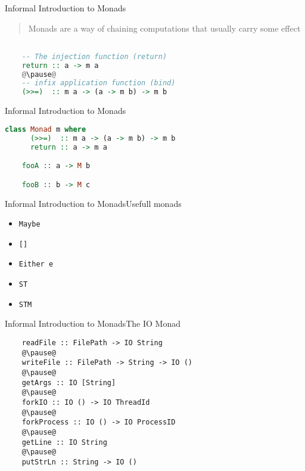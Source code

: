 \documentclass[rail]{beamer}
\begin{document}
\begin{frame}[fragile]{Informal Introduction to Monads}

  \begin{quote}
    Monads are a way of chaining computations that usually carry some
    effect
  \end{quote}
  \pause
  \begin{lstlisting}[language=Haskell]

    -- The injection function (return)
    return :: a -> m a
    @\pause@
    -- infix application function (bind)
    (>>=)  :: m a -> (a -> m b) -> m b

  \end{lstlisting}


\end{frame}

\begin{frame}[fragile]{Informal Introduction to Monads}
  \begin{lstlisting}[language=Haskell]
    class Monad m where
      (>>=)  :: m a -> (a -> m b) -> m b
      return :: a -> m a

    fooA :: a -> M b

    fooB :: b -> M c
  \end{lstlisting}
\end{frame}

\begin{frame}{Informal Introduction to Monads}{Usefull monads}
  \pause
  \begin{itemize}[<+->]
  \item \texttt{Maybe}
  \item \texttt{[]}
  \item \texttt{Either e}
  \item \texttt{ST}
  \item \texttt{STM}
  \end{itemize}
\end{frame}

\begin{frame}[fragile]{Informal Introduction to Monads}{The IO Monad}
  \begin{lstlisting}
    readFile :: FilePath -> IO String
    @\pause@
    writeFile :: FilePath -> String -> IO ()
    @\pause@
    getArgs :: IO [String]
    @\pause@
    forkIO :: IO () -> IO ThreadId
    @\pause@
    forkProcess :: IO () -> IO ProcessID
    @\pause@
    getLine :: IO String
    @\pause@
    putStrLn :: String -> IO ()
  \end{lstlisting}
\end{frame}
\end{document}
